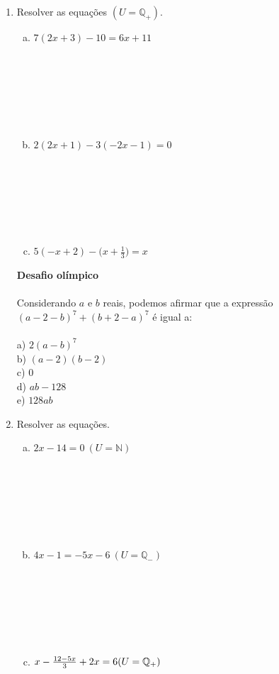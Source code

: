 \documentclass[a4paper,14pt]{article}
\begin{document}
\begin{multicols}{2}
\begin{enumerate}
			\item Resolver as equações $(U = \mathbb{Q_+})$.
			\begin{enumerate}[a)]
				\item $7(2x + 3) - 10 = 6x + 11$ \\\\\\\\\\\\\\
				\item $2(2x + 1) - 3(-2x - 1) = 0$ \\\\\\\\\\\\\\
				\item $5(-x + 2) - \bigg(x + \frac{1}{3}\bigg) = x$ \newpage
			\end{enumerate}
			\textbf{Desafio olímpico} \\\\
			Considerando $a$ e $b$ reais, podemos afirmar que a expressão $(a - 2 - b)^7 + (b + 2 - a)^7$ é igual a: \\\\
			a) $2(a - b)^7$ \\
			b) $(a - 2)(b - 2)$ \\
			c) $0$ \\
			d) $ab - 128$ \\
			e) $128ab$ \columnbreak
			\item Resolver as equações.
			\begin{enumerate}[a)]
				\item $2x - 14 = 0~(U = \mathbb{N})$ \\\\\\\\\\\\\\
				\item $4x - 1 = -5x - 6~(U = \mathbb{Q_-})$ \\\\\\\\\\\\\\
				\item $x - \frac{12 - 5x}{3} + 2x = 6 \\ (U = \mathbb{Q_+})$ \\\\\\\\\\\\\\

\end{enumerate}
\end{enumerate}
\end{multicols}
\end{document}
